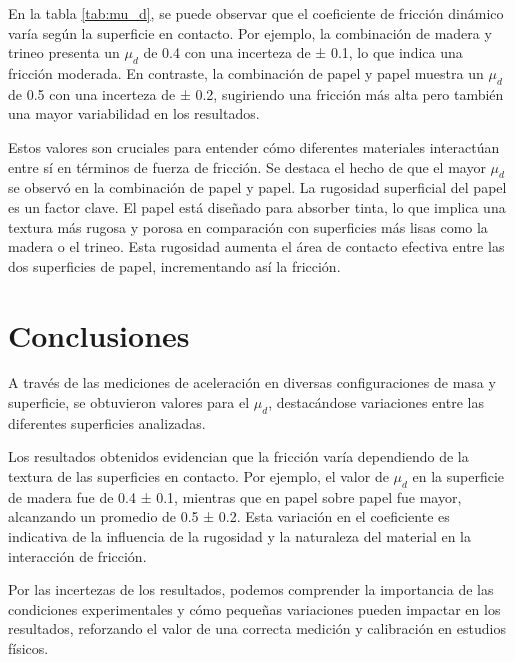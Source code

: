 \documentclass[12pt,a4]{article}
\begin{document}
En la tabla \ref{tab:mu_d}, se puede observar que el coeficiente de fricción dinámico varía según la superficie en contacto. Por ejemplo, la combinación de madera y trineo presenta un $\mu_d$ de 0.4 con una incerteza de ± 0.1, lo que indica una fricción moderada. En contraste, la combinación de papel y papel muestra un $\mu_d$ de 0.5 con una incerteza de ± 0.2, sugiriendo una fricción más alta pero también una mayor variabilidad en los resultados.

Estos valores son cruciales para entender cómo diferentes materiales interactúan entre sí en términos de fuerza de fricción. Se destaca el hecho de que el mayor $\mu_d$ se observó en la combinación de papel y papel. La rugosidad superficial del papel es un factor clave. El papel está diseñado para absorber tinta, lo que implica una textura más rugosa y porosa en comparación con superficies más lisas como la madera o el trineo. Esta rugosidad aumenta el área de contacto efectiva entre las dos superficies de papel, incrementando así la fricción.
\section{Conclusiones}

A través de las mediciones de aceleración en diversas configuraciones de masa y superficie, se obtuvieron valores para el $\mu_d$, destacándose variaciones entre las diferentes superficies analizadas.

Los resultados obtenidos evidencian que la fricción varía dependiendo de la textura de las superficies en contacto. Por ejemplo, el valor de $\mu_d$ en la superficie de madera fue de 0.4 ± 0.1, mientras que en papel sobre papel fue mayor, alcanzando un promedio de 0.5 ± 0.2. Esta variación en el coeficiente es indicativa de la influencia de la rugosidad y la naturaleza del material en la interacción de fricción.

Por las incertezas de los resultados, podemos comprender la importancia de las condiciones experimentales y cómo pequeñas variaciones pueden impactar en los resultados, reforzando el valor de una correcta medición y calibración en estudios físicos.
\end{document}
